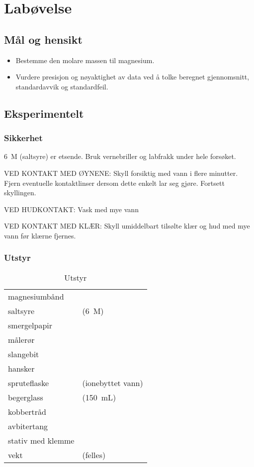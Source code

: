 	\clearpage
	
	\section{Labøvelse}
	
	\subsection{Mål og hensikt}
	\begin{itemize}
		\item Bestemme den molare massen til magnesium.
		\item Vurdere presisjon og nøyaktighet av data ved å tolke beregnet gjennomsnitt, standardavvik og standardfeil.
	\end{itemize}
	
	\subsection{Eksperimentelt}
	
	\subsubsection{Sikkerhet}
	\SI{6}{M}  (saltsyre) er etsende. Bruk vernebriller og labfrakk under hele forsøket.
	
	VED KONTAKT MED ØYNENE: Skyll forsiktig med vann i flere minutter. Fjern eventuelle kontaktlinser dersom dette enkelt lar seg gjøre. Fortsett skyllingen.
	
	VED HUDKONTAKT: Vask med mye vann
	
	VED KONTAKT MED KLÆR: Skyll umiddelbart tilsølte klær og hud med mye vann før klærne fjernes. 
	
	\subsubsection{Utstyr}
	
	\begin{table}[htpb]
		\caption{Utstyr}
		\label{equipment}
		\begin{tabular}{ll}
			\toprule
			magnesiumbånd & \\ 
			saltsyre & (\SI{6}{M}) \\
			smergelpapir & \\
			målerør & \\
			slangebit & \\
			hansker & \\
			spruteflaske & (ionebyttet vann) \\
			begerglass & (\SI{150}{mL}) \\
			kobbertråd & \\
			avbitertang & \\ 
			stativ med klemme & \\ 
			vekt & (felles) \\ \bottomrule 
		\end{tabular}
	\end{table}
	
